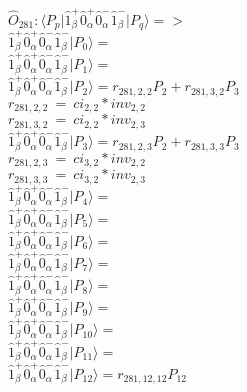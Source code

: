 \documentclass[14pt]{article}
\begin{document}
    $\hat{O}_{281}:  \langle{P_p}\vert \hat{1}_{\beta}^{+}\hat{0}_{\alpha}^{+}\hat{0}_{\alpha}^{-}\hat{1}_{\beta}^{-} \vert{P_q}\rangle => $ \\ 
    $ \hat{1}_{\beta}^{+}\hat{0}_{\alpha}^{+}\hat{0}_{\alpha}^{-}\hat{1}_{\beta}^{-} \vert{P_{0}}\rangle =  $ \\ 
    $ \hat{1}_{\beta}^{+}\hat{0}_{\alpha}^{+}\hat{0}_{\alpha}^{-}\hat{1}_{\beta}^{-} \vert{P_{1}}\rangle =  $ \\ 
    $ \hat{1}_{\beta}^{+}\hat{0}_{\alpha}^{+}\hat{0}_{\alpha}^{-}\hat{1}_{\beta}^{-} \vert{P_{2}}\rangle = {r}_{281,2,2}P_{2}+{r}_{281,3,2}P_{3} $ \\ 
    ${r}_{281,2,2}\ =\ {ci}_{2,2}*{inv}_{2,2} $ \\ 
    ${r}_{281,3,2}\ =\ {ci}_{2,2}*{inv}_{2,3} $ \\ 
    $ \hat{1}_{\beta}^{+}\hat{0}_{\alpha}^{+}\hat{0}_{\alpha}^{-}\hat{1}_{\beta}^{-} \vert{P_{3}}\rangle = {r}_{281,2,3}P_{2}+{r}_{281,3,3}P_{3} $ \\ 
    ${r}_{281,2,3}\ =\ {ci}_{3,2}*{inv}_{2,2} $ \\ 
    ${r}_{281,3,3}\ =\ {ci}_{3,2}*{inv}_{2,3} $ \\ 
    $ \hat{1}_{\beta}^{+}\hat{0}_{\alpha}^{+}\hat{0}_{\alpha}^{-}\hat{1}_{\beta}^{-} \vert{P_{4}}\rangle =  $ \\ 
    $ \hat{1}_{\beta}^{+}\hat{0}_{\alpha}^{+}\hat{0}_{\alpha}^{-}\hat{1}_{\beta}^{-} \vert{P_{5}}\rangle =  $ \\ 
    $ \hat{1}_{\beta}^{+}\hat{0}_{\alpha}^{+}\hat{0}_{\alpha}^{-}\hat{1}_{\beta}^{-} \vert{P_{6}}\rangle =  $ \\ 
    $ \hat{1}_{\beta}^{+}\hat{0}_{\alpha}^{+}\hat{0}_{\alpha}^{-}\hat{1}_{\beta}^{-} \vert{P_{7}}\rangle =  $ \\ 
    $ \hat{1}_{\beta}^{+}\hat{0}_{\alpha}^{+}\hat{0}_{\alpha}^{-}\hat{1}_{\beta}^{-} \vert{P_{8}}\rangle =  $ \\ 
    $ \hat{1}_{\beta}^{+}\hat{0}_{\alpha}^{+}\hat{0}_{\alpha}^{-}\hat{1}_{\beta}^{-} \vert{P_{9}}\rangle =  $ \\ 
    $ \hat{1}_{\beta}^{+}\hat{0}_{\alpha}^{+}\hat{0}_{\alpha}^{-}\hat{1}_{\beta}^{-} \vert{P_{10}}\rangle =  $ \\ 
    $ \hat{1}_{\beta}^{+}\hat{0}_{\alpha}^{+}\hat{0}_{\alpha}^{-}\hat{1}_{\beta}^{-} \vert{P_{11}}\rangle =  $ \\ 
    $ \hat{1}_{\beta}^{+}\hat{0}_{\alpha}^{+}\hat{0}_{\alpha}^{-}\hat{1}_{\beta}^{-} \vert{P_{12}}\rangle = {r}_{281,12,12}P_{12} $ \\ 
\end{document}
